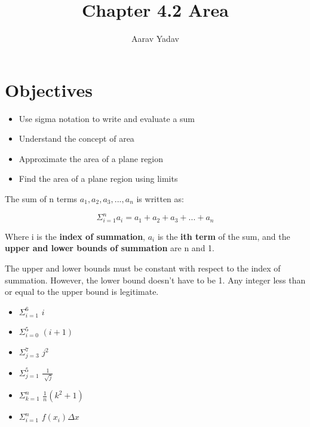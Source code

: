 \documentclass{article}
\title{Chapter 4.2 Area}
\author{Aarav Yadav}
\theoremstyle{mytheoremstyle}
\theoremstyle{mytheoremstyle}
\theoremstyle{myproblemstyle}
\begin{document}
    \maketitle

    \setcounter{section}{4}
    \setcounter{definition}{3}
    \setcounter{theorem}{1}
    \setcounter{problem}{9}

    \section*{Objectives}
    \begin{itemize}
        \item Use sigma notation to write and evaluate a sum
        \item Understand the concept of area
        \item Approximate the area of a plane region
        \item Find the area of a plane region using limits
    \end{itemize}

    \begin{definition}

        The sum of n terms $ a_{1}, a_{2}, a_{3}, ... ,a_{n} $ is written as: 

        $$ \Sigma_{i=1}^n a_{i} = a_{1} + a_{2} + a_{3} + ... + a_{n} $$

        Where i is the \textbf{index of summation}, $ a_{i} $ is the \textbf{ith term} 
        of the sum, and the \textbf{upper and lower bounds of summation} are n and 1.
        
    \end{definition}

    \begin{problem}

        The upper and lower bounds must be constant with respect to the index of summation.
        However, the lower bound doesn't have to be 1. Any integer less than or equal to 
        the upper bound is legitimate. 

        \begin{itemize}
            \item $ \Sigma_{i=1}^6 $ \indent $ i $ 
            \item $ \Sigma_{i=0}^5 $ \indent $ (i+1) $
            \item $ \Sigma_{j=3}^7 $ \indent $ j^2  $
            \item $ \Sigma_{j=1}^5 $ \indent $ \frac{1}{\sqrt[]{j}} $
            \item $ \Sigma_{k=1}^n $ \indent $ \frac{1}{n} (k^2+1)  $
            \item $ \Sigma_{i=1}^n $ \indent $ f(x_{i})\Delta x$
        \end{itemize}
    \end{problem}
    
\end{document}
